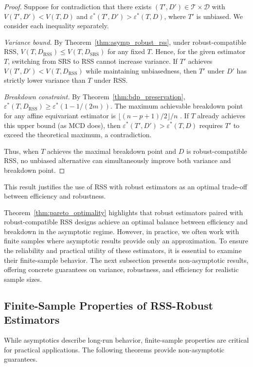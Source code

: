 \documentclass[12pt]{article}
\begin{document}
\begin{proof}
Suppose for contradiction that there exists $(T', D') \in \mathcal{T} \times \mathcal{D}$ with $V(T', D') < V(T, D)$ and $\varepsilon^*(T', D') > \varepsilon^*(T, D)$, where $T'$ is unbiased. We consider each inequality separately.

\emph{Variance bound.} By Theorem~\ref{thm:asymp_robust_rss}, under robust-compatible RSS, $V(T, D_{\mathrm{RSS}}) \leq V(T, D_{\mathrm{SRS}})$ for any fixed $T$. Hence, for the given estimator $T$, switching from SRS to RSS cannot increase variance. If $T'$ achieves $V(T', D') < V(T, D_{\mathrm{RSS}})$ while maintaining unbiasedness, then $T'$ under $D'$ has strictly lower variance than $T$ under RSS.

\emph{Breakdown constraint.} By Theorem~\ref{thm:bdp_preservation}, $\varepsilon^*(T, D_{\mathrm{RSS}}) \geq \varepsilon^*(1 - 1/(2m))$. The maximum achievable breakdown point for any affine equivariant estimator is $\lfloor(n - p + 1)/2\rfloor / n$ \citep{maronna2019robust}. If $T$ already achieves this upper bound (as MCD does), then $\varepsilon^*(T', D') > \varepsilon^*(T, D)$ requires $T'$ to exceed the theoretical maximum, a contradiction.

Thus, when $T$ achieves the maximal breakdown point and $D$ is robust-compatible RSS, no unbiased alternative can simultaneously improve both variance and breakdown point.
\end{proof}
This result justifies the use of RSS with robust estimators as an optimal trade-off between efficiency and robustness.


Theorem~\ref{thm:pareto_optimality} highlights that robust estimators paired with robust-compatible RSS designs achieve an optimal balance between efficiency and breakdown in the asymptotic regime. However, in practice, we often work with finite samples where asymptotic results provide only an approximation. To ensure the reliability and practical utility of these estimators, it is essential to examine their finite-sample behavior. The next subsection presents non-asymptotic results, offering concrete guarantees on variance, robustness, and efficiency for realistic sample sizes.
\subsection{Finite-Sample Properties of RSS-Robust Estimators}
\label{subsec:finite_sample}

While asymptotics describe long-run behavior, finite-sample properties are critical for practical applications. The following theorems provide non-asymptotic guarantees.
\end{document}
